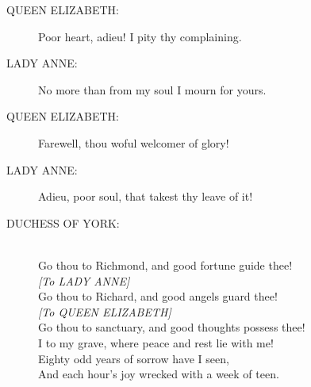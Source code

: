 \documentclass{article}
\begin{document}
\begin{description}
\item[QUEEN ELIZABETH:] 
\hspace{1pt}Poor heart, adieu! I pity thy complaining.\\
\end{description}
\begin{description}
\item[LADY ANNE:] 
\hspace{1pt}No more than from my soul I mourn for yours.\\
\end{description}
\begin{description}
\item[QUEEN ELIZABETH:] 
\hspace{1pt}Farewell, thou woful welcomer of glory!\\
\end{description}
\begin{description}
\item[LADY ANNE:] 
\hspace{1pt}Adieu, poor soul, that takest thy leave of it!\\
\end{description}
\begin{description}
\item[DUCHESS OF YORK:] 
\hspace{1pt}\\
\hspace{1pt}Go thou to Richmond, and good fortune guide thee!\\
{\it [To LADY ANNE]}\\
\hspace{1pt}Go thou to Richard, and good angels guard thee!\\
{\it [To QUEEN ELIZABETH]}\\
\hspace{1pt}Go thou to sanctuary, and good thoughts possess thee!\\
\hspace{1pt}I to my grave, where peace and rest lie with me!\\
\hspace{1pt}Eighty odd years of sorrow have I seen,\\
\hspace{1pt}And each hour's joy wrecked with a week of teen.\\
\end{description}
\end{document}
